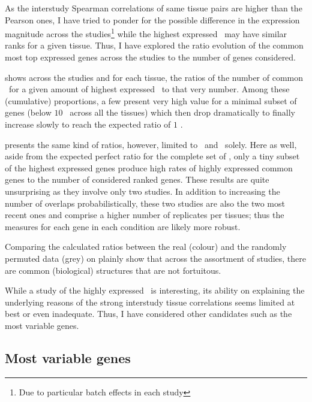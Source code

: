 As the interstudy Spearman correlations of same tissue pairs
are higher than the Pearson ones,
I have tried to ponder for the possible difference in the expression magnitude
across the studies\footnote{Due to particular batch effects in each study}
while the highest expressed \pc\ may have similar ranks
for a given tissue.
Thus, I have explored the ratio evolution of the common most top expressed
genes across the studies to the number of genes considered.

 shows across the studies and for each tissue,
the ratios of the number of
common \pcgs\ for a given amount of highest expressed \pcgs\
to that very number.
Among these (cumulative) proportions,
a few present very high value for
a minimal subset of genes (below $10$ \FPKM\ across all the tissues)
which then drop dramatically to finally increase slowly
to reach the expected ratio of $1$ \FPKM{}.
\begin{comment}
as the \pcgs\ set across the studies is identical.
\end{comment}

 presents the same kind of ratios,
however, limited to \uhlen\ and \gtex\ solely.
Here as well, aside from the expected perfect ratio for the complete set of
\pcgs,
only a tiny subset of the highest expressed genes produce high rates of
highly expressed common genes to the number of considered ranked genes.
These results are quite unsurprising as they involve only two studies.
In addition to increasing the number of overlaps probabilistically,
these two studies are also the two most recent ones
and comprise a higher number of replicates per tissues;
thus the measures for each gene in each condition are likely more robust.

Comparing the calculated ratios between the real (colour) and
the randomly permuted data (grey)
on 
plainly show that across the assortment of studies,
there are common (biological) structures
that are not fortuitous.

While a study of the highly expressed \pcgs\ is interesting,
its ability on explaining the underlying reasons
of the strong interstudy tissue correlations seems limited at best
or even inadequate.
Thus, I have considered other candidates
such as the most variable genes.

\subsection{Most variable genes}


